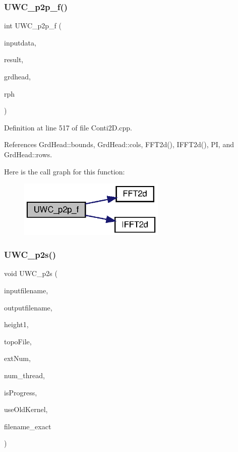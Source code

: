 \subsubsection{U\+W\+C\+\_\+p2p\+\_\+f()\hspace{0.1cm}{\footnotesize\ttfamily [2/2]}}
{\footnotesize\ttfamily int U\+W\+C\+\_\+p2p\+\_\+f (\begin{DoxyParamCaption}\item[{double $\ast$}]{inputdata,  }\item[{double $\ast$}]{result,  }\item[{\textbf{ Grd\+Head}}]{grdhead,  }\item[{double}]{rph }\end{DoxyParamCaption})}



Definition at line 517 of file Conti2\+D.\+cpp.



References Grd\+Head\+::bounds, Grd\+Head\+::cols, F\+F\+T2d(), I\+F\+F\+T2d(), PI, and Grd\+Head\+::rows.

Here is the call graph for this function\+:\nopagebreak
\begin{figure}[H]
\begin{center}
\leavevmode
\includegraphics[width=199pt]{Conti2D_8h_a016dc620865e33635aabc81c129eac30_a016dc620865e33635aabc81c129eac30_cgraph}
\end{center}
\end{figure}
\mbox{\label{Conti2D_8h_af8adb87017663774bfd342b39facc828_af8adb87017663774bfd342b39facc828}} 
\subsubsection{U\+W\+C\+\_\+p2s()}
{\footnotesize\ttfamily void U\+W\+C\+\_\+p2s (\begin{DoxyParamCaption}\item[{string}]{inputfilename,  }\item[{string}]{outputfilename,  }\item[{double}]{height1,  }\item[{string}]{topo\+File,  }\item[{int}]{ext\+Num,  }\item[{int}]{num\+\_\+thread,  }\item[{bool}]{is\+Progress,  }\item[{bool}]{use\+Old\+Kernel,  }\item[{string}]{filename\+\_\+exact }\end{DoxyParamCaption})}



